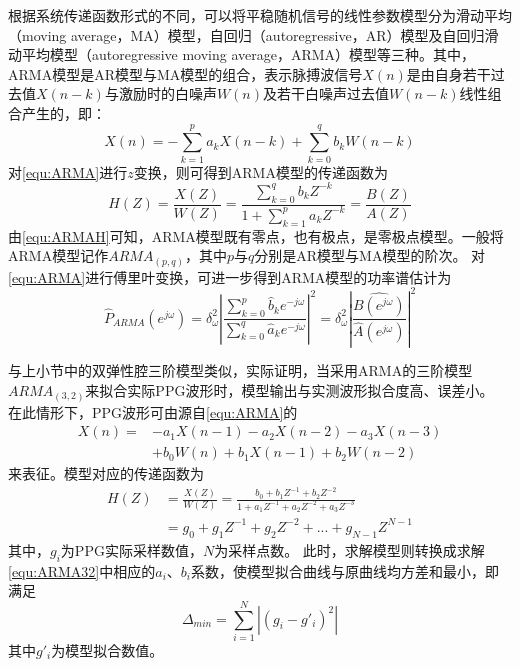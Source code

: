 根据系统传递函数形式的不同，可以将平稳随机信号的线性参数模型分为滑动平均（moving average，MA）模型，自回归（autoregressive，AR）模型及自回归滑动平均模型（autoregressive moving average，ARMA）模型等三种。其中，
ARMA模型是AR模型与MA模型的组合，表示脉搏波信号$X(n)$是由自身若干过去值$X(n-k)$与激励时的白噪声$W(n)$及若干白噪声过去值$W(n-k)$线性组合产生的，即：
\begin{equation}
    \label{equ:ARMA}
    X(n)=-\sum_{k=1}^{p}a_{k}X(n-k)+\sum_{k=0}^{q}b_{k}W(n-k)
\end{equation}
对\autoref{equ:ARMA}进行$z$变换，则可得到ARMA模型的传递函数为
\begin{equation}
    \label{equ:ARMAH}
    H(Z)=\frac{X(Z)}{W(Z)}=\frac{\sum_{k=0}^{q}b_{k}Z^{-k}}{1+\sum_{k=1}^{p}a_{k}Z^{-k}}=\frac{B(Z)}{A(Z)}
\end{equation}
由\autoref{equ:ARMAH}可知，ARMA模型既有零点，也有极点，是零极点模型。一般将ARMA模型记作$ARMA_{(p,q)}$，其中$p$与$q$分别是AR模型与MA模型的阶次。
对\autoref{equ:ARMA}进行傅里叶变换，可进一步得到ARMA模型的功率谱估计为\cite{Qiu2012}
\begin{equation}
    \label{equ:ARMAP}
    \hat{P}_{ARMA}(e^{j\omega} )=
    \delta _{\omega}^2\left |  \frac{\sum_{k=0}^{p}\hat{b}_{k}e^{-j\omega}}{\sum_{k=0}^{q}\hat{a}_{k}e^{-j\omega}}\right |^2
    =\delta _{\omega}^2\left |  \frac{\hat{B(e^{j\omega} )}}{\hat{A}(e^{j\omega} )}\right |^2
\end{equation}

与上小节中的双弹性腔三阶模型类似，实际证明，当采用ARMA的三阶模型$ARMA_{(3,2)}$来拟合实际PPG波形时，模型输出与实测波形拟合度高、误差小\cite{PPGYY}。
在此情形下，PPG波形可由源自\autoref{equ:ARMA}的
\begin{equation}
    \label{equ:ARMA32}
    \begin{aligned}
        X(n)=&-a_{1}X(n-1)-a_{2}X(n-2)-a_{3}X(n-3)\\
        &+b_{0}W(n)+b_{1}X(n-1)+b_{2}W(n-2)
    \end{aligned}
\end{equation}
来表征。模型对应的传递函数为
\begin{equation}
    \label{equ:ARMAH32}
    \begin{aligned}
        H(Z)&=\frac{X(Z)}{W(Z)}=\frac{b_{0}+b_{1}Z^{-1}+b_{2}Z^{-2}}{1+a_{1}Z^{-1}+a_{2}Z^{-2}+a_{3}Z^{-3}}\\
        &=g_{0}+g_{1}Z^{-1}+g_{2}Z^{-2}+...+g_{N-1}Z^{N-1}
    \end{aligned}
\end{equation}
其中，$g_{i}$为PPG实际采样数值，$N$为采样点数。
此时，求解模型则转换成求解\autoref{equ:ARMA32}中相应的$a_{i}$、$b_{i}$系数，使模型拟合曲线与原曲线均方差和最小，即满足
\begin{equation}
    \label{equ:MeanSum}
    \Delta_{min}=\sum_{i=1}^{N}\left |  (g_i-g'_i)^2\right |
\end{equation}
其中$g'_i$为模型拟合数值。


